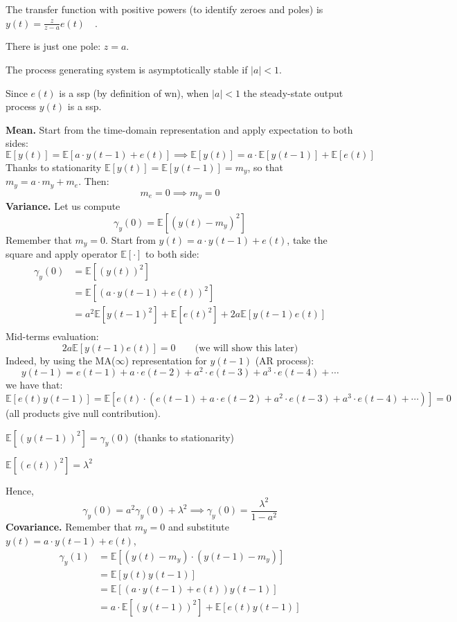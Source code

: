 The transfer function with positive powers (to identify zeroes and poles) is $y(t)=\frac{z}{z-a} e(t) \quad$.

There is just one pole: $z=a .$

The process generating system is asymptotically stable if $|a| <1$. 

Since $e(t)$ is a \gls{ssp} (by definition of \gls{wn}), when $|a| <1$ the steady-state output process $y(t)$ is a \gls{ssp}.

\textbf{Mean.}
Start from the time-domain representation and apply expectation to both sides:
\[
	\mathbb{E}[y(t)]=\mathbb{E}[a \cdot y(t-1)+e(t)] \implies \mathbb{E}[y(t)]=a \cdot \mathbb{E}[y(t-1)]+\mathbb{E}[e(t)]
\]
Thanks to stationarity $\mathbb{E}[y(t)]=\mathbb{E}[y(t-1)]=m_{y}$, so that $m_{y}=a \cdot m_{y}+m_{e}$.
Then:
$$
m_{e}=0 \implies  m_{y}=0
$$
\textbf{Variance.}
Let us compute
\[
	\gamma_{y}(0)=\mathbb{E}\left[\left(y(t)-m_{y}\right)^{2}\right]
\]
Remember that $m_{y}=0$. Start from $y(t)=a \cdot y(t-1)+e(t)$, take the square and apply operator $\mathbb{E}[\cdot]$ to both side:
\begin{align*}
	\gamma_{y}(0)&=\mathbb{E}\left[(y(t))^{2}\right]\\
	&=\mathbb{E}\left[(a \cdot y(t-1)+e(t))^{2}\right]\\
	&=a^{2} \mathbb{E}\left[y(t-1)^{2}\right]+\mathbb{E}\left[e(t)^{2}\right]+2 a \mathbb{E}[y(t-1) e(t)]\\
\end{align*}
Mid-terms evaluation:
\[
	2 a \mathbb{E}[y(t-1) e(t)]=0 \qquad \text{(we will show this later)}
\]
Indeed, by using the MA($\infty$) representation for $y(t-1)$ (AR process):
$$
y(t-1)=e(t-1)+a \cdot e(t-2)+a^{2} \cdot e(t-3)+a^{3} \cdot e(t-4)+\cdots
$$
we have that:
\[
	\mathbb{E}[e(t) y(t-1)]=\mathbb{E}\left[e(t) \cdot\left(e(t-1)+a \cdot e(t-2)+a^{2} \cdot e(t-3)+a^{3} \cdot e(t-4)+\cdots\right)\right]=0
\]
(all products give null contribution).


$\mathbb{E}\left[(y(t-1))^{2}\right]=\gamma_{y}(0)$ (thanks to stationarity)

$\mathbb{E}\left[(e(t))^{2}\right]=\lambda^{2}$

Hence,
\[
	\gamma_{y}(0)=a^{2} \gamma_{y}(0)+\lambda^{2} \implies \gamma_{y}(0)=\frac{\lambda^{2}}{1-a^{2}}
\]
\textbf{Covariance.}
Remember that $m_{y}=0$ and substitute $y(t)=a \cdot y(t-1)+e(t)$,
\begin{align*}
	\gamma_{y}(1)&=\mathbb{E}\left[\left(y(t)-m_{y}\right) \cdot\left(y(t-1)-m_{y}\right)\right]\\
	&=\mathbb{E}[y(t) y(t-1)]\\
	&=\mathbb{E}[(a \cdot y(t-1)+e(t))y(t-1)]\\
	&=a \cdot \mathbb{E}\left[(y(t-1))^{2}\right]+\mathbb{E}[e(t) y(t-1)]
\end{align*}

